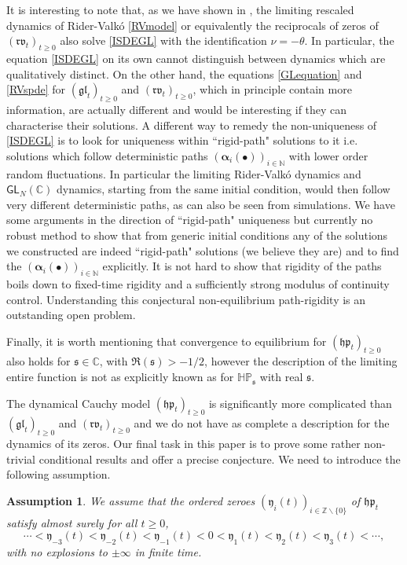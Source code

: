 \documentclass[]{article}
\newtheorem{ass}[thm]{Assumption}
\begin{document}
It is interesting to note that, as we have shown in \cite{AM24}, the limiting rescaled dynamics of Rider-Valk\'{o} \eqref{RVmodel} or equivalently the reciprocals of zeros of $(\mathfrak{rv}_t)_{t\ge0} $ also solve \eqref{ISDEGL} with the identification $\nu=-\theta$. In particular, the equation \eqref{ISDEGL} on its own cannot distinguish between dynamics which are qualitatively distinct. On the other hand, the equations \eqref{GLequation} and \eqref{RVspde} for $(\mathfrak{gl}_t)_{t\ge 0}$ and $(\mathfrak{rv}_t)_{t\ge 0}$, which in principle contain more information, are actually different and would be interesting if they can characterise their solutions. A different way to remedy the non-uniqueness of \eqref{ISDEGL} is to look for uniqueness within ``rigid-path" solutions to it i.e. solutions which follow deterministic paths $(\boldsymbol{\alpha}_i(\bullet))_{i\in \mathbb{N}}$ with lower order random fluctuations. In particular the limiting Rider-Valk\'{o} dynamics and $\mathsf{GL}_N(\mathbb{C})$ dynamics, starting from the same initial condition, would then follow very different deterministic paths, as can also be seen from simulations. We have some arguments in the direction of ``rigid-path" uniqueness but currently no robust method to show that from generic initial conditions any of the solutions we constructed are indeed ``rigid-path" solutions (we believe they are) and to find the $(\boldsymbol{\alpha}_i(\bullet))_{i\in \mathbb{N}}$ explicitly. It is not hard to show that rigidity of the paths boils down to fixed-time rigidity and a sufficiently strong modulus of continuity control. Understanding this conjectural non-equilibrium path-rigidity is an outstanding open problem.

Finally, it is worth mentioning that convergence to equilibrium for $(\mathfrak{hp}_t)_{t\ge 0}$ also holds for $\mathfrak{s}\in \mathbb{C}$, with $\Re(\mathfrak{s})>-1/2$, however the description of the limiting entire function is not as explicitly known as for $\mathbb{HP}_\mathfrak{s}$ with real $\mathfrak{s}$.


The dynamical Cauchy model $(\mathfrak{hp}_t)_{t\ge0}$ is significantly more complicated than $(\mathfrak{gl}_t)_{t\ge0}$ and $(\mathfrak{rv}_t)_{t\ge0}$ and we do not have as complete a description for the dynamics of its zeros. Our final task in this paper is to prove some rather non-trivial conditional results and offer a precise conjecture. We need to introduce the following assumption. 
\begin{ass}\label{Assumption}
We assume that the ordered zeroes $(\mathfrak{y}_i(t))_{i\in \mathbb{Z}\backslash \{0\}}$ of $\mathfrak{hp}_t$ satisfy almost surely for all $t\ge 0$,
\begin{equation*}
\cdots <\mathfrak{y}_{-3}(t)<\mathfrak{y}_{-2}(t)<\mathfrak{y}_{-1}(t)<0< \mathfrak{y}_1(t)<\mathfrak{y}_2(t)<\mathfrak{y}_3(t)<\cdots, 
\end{equation*}
with no explosions to $\pm \infty$ in finite time.
\end{ass}
\end{document}
